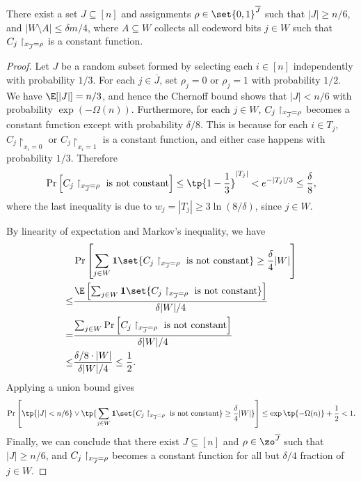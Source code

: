 \begin{lemma} \label{lem:random-restriction}
There exist a set $J \subseteq [n]$ and assignments $\rho \in \set{0,1}^{\overline{J}}$ such that $|J| \ge n/6$, and $|W \setminus A| \le \delta m/4$, where $A \subseteq W$ collects all codeword bits $j \in W$ such that $C_j \restriction_{\*x_{\overline{J}}=\rho}$ is a constant function.
\end{lemma}
\begin{proof}
Let $J$ be a random subset formed by selecting each $i \in [n]$ independently with probability $1/3$. For each $j \in \overline{J}$, set $\rho_j = 0$ or $\rho_j = 1$ with probability $1/2$. We have $\E[|J|]=n/3$, and hence the Chernoff bound shows that $|J| < n/6$ with probability $\exp(-\Omega(n))$. Furthermore, for each $j \in W$, $C_j\restriction_{\*x_{\overline{J}}=\rho}$ becomes a constant function except with probability $\delta/8$.  This is because for each $i \in T_j$, $C_j\restriction_{x_i=0}$ or $C_j\restriction_{x_i=1}$ is a constant function, and either case happens with probability $1/3$. Therefore
\begin{align*}
	\Pr\left[ C_j\restriction_{\*x_{\overline{J}}=\rho}\textup{ is not constant} \right] \le \tp{1-\frac{1}{3}}^{|T_j|} < e^{-|T_j|/3} \le \frac{\delta}{8}, 
\end{align*} 
where the last inequality is due to $w_j = |T_j| \ge 3\ln(8/\delta)$, since $j \in W$.

By linearity of expectation and Markov's inequality, we have
\begin{align*}
	  & \Pr\left[ \sum_{j \in W}\mathbf{1}\set{C_j\restriction_{\*x_{\overline{J}}=\rho}\textup{ is not constant}} \ge \frac{\delta}{4}|W| \right] \\
	\le& \frac{ \E\left[ \sum_{j \in W}\mathbf{1}\set{C_j\restriction_{\*x_{\overline{J}}=\rho}\textup{ is not constant}} \right]}{\delta|W|/4} \\
	=& \frac{\sum_{j \in W}\Pr\left[ C_j\restriction_{\*x_{\overline{J}}=\rho}\textup{ is not constant} \right]}{\delta|W|/4} \\
	\le& \frac{\delta/8 \cdot |W|}{\delta|W|/4} \le \frac{1}{2}.
\end{align*}
Applying a union bound gives
\begin{align*}
	\Pr\left[ \tp{|J| < n/6} \lor \tp{\sum_{j \in W}\mathbf{1}\set{C_j\restriction_{\*x_{\overline{J}}=\rho}\textup{ is not constant}} \ge \frac{\delta}{4}|W|} \right] \le \exp\tp{-\Omega(n)} + \frac{1}{2} < 1.
\end{align*}
Finally, we can conclude that there exist $J \subseteq [n]$ and $\rho\in\zo^{\overline{J}}$ such that $|J| \ge n/6$, and $C_j\restriction_{\*x_{\overline{J}}=\rho}$ becomes a constant function for all but $\delta/4$ fraction of $j \in W$. 
\end{proof}

